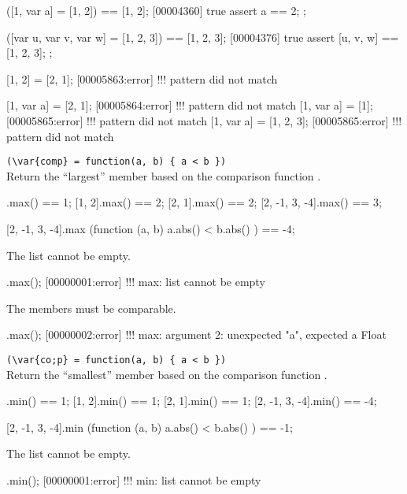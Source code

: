 \begin{urbiscriptapi}
\begin{urbiscript}
([1, var a] = [1, 2]) == [1, 2];
[00004360] true
assert
{
  a == 2;
};

([var u, var v, var w] = [1, 2, 3]) == [1, 2, 3];
[00004376] true
assert
{
  [u, v, w] == [1, 2, 3];
};

[1, 2] = [2, 1];
[00005863:error] !!! pattern did not match

[1, var a] = [2, 1];
[00005864:error] !!! pattern did not match
[1, var a] = [1];
[00005865:error] !!! pattern did not match
[1, var a] = [1, 2, 3];
[00005865:error] !!! pattern did not match
\end{urbiscript}


\item {}\lstinline|(\var{comp} = function(a, b) { a < b })|\\%
  Return the ``largest'' member based on the comparison function .
\begin{urbiassert}
           [1].max() == 1;
        [1, 2].max() == 2;
        [2, 1].max() == 2;
[2, -1, 3, -4].max() == 3;

[2, -1, 3, -4].max (function (a, b) { a.abs() < b.abs() }) == -4;
\end{urbiassert}

The list cannot be empty.

\begin{urbiscript}
[].max();
[00000001:error] !!! max: list cannot be empty
\end{urbiscript}

The members must be comparable.
\begin{urbiscript}
[0, 2, "a", 1].max();
[00000002:error] !!! max: argument 2: unexpected "a", expected a Float
\end{urbiscript}


\item {}\lstinline|(\var{co;p} = function(a, b) { a < b })|\\%
  Return the ``smallest'' member based on the comparison function .
\begin{urbiassert}
           [1].min() == 1;
        [1, 2].min() == 1;
        [2, 1].min() == 1;
[2, -1, 3, -4].min() == -4;

[2, -1, 3, -4].min (function (a, b) { a.abs() < b.abs() }) == -1;
\end{urbiassert}

The list cannot be empty.

\begin{urbiscript}
[].min();
[00000001:error] !!! min: list cannot be empty
\end{urbiscript}



\end{urbiscriptapi}
